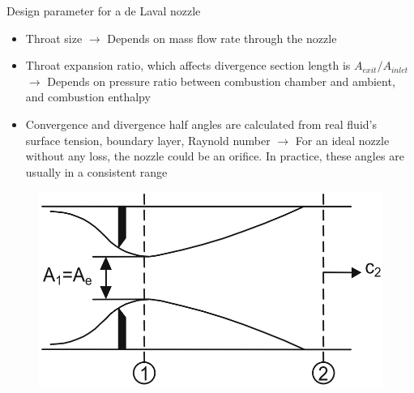 \documentclass{beamer}
\begin{document}
\begin{frame}[t]{Design parameter for a de Laval nozzle}
    \noindent
    \begin{minipage}[t]{0.6\textwidth}
        \vspace{-5pt}
        \begin{itemize}
            \item Throat size $\rightarrow$ Depends on mass flow rate through the nozzle
            \item Throat expansion ratio, which affects divergence section length is $A_{exit}/A_{inlet}$ $\rightarrow$ Depends on pressure ratio between combustion chamber and ambient, and combustion enthalpy
            \item Convergence and divergence half angles are calculated from real fluid's surface tension, boundary layer, Raynold number
            $\rightarrow$ For an ideal nozzle without any loss, the nozzle could be an orifice. In practice, these angles are usually in a consistent range
        \end{itemize}
    \end{minipage}%
    \hfill
    \begin{minipage}[t]{0.35\textwidth}
        \vspace{30pt}
        \begin{figure}[t]
            \centering
            \includegraphics[width=\textwidth]{images/orifice_nozzle.png}
        \end{figure}
    \end{minipage}    
\end{frame}
\end{document}
